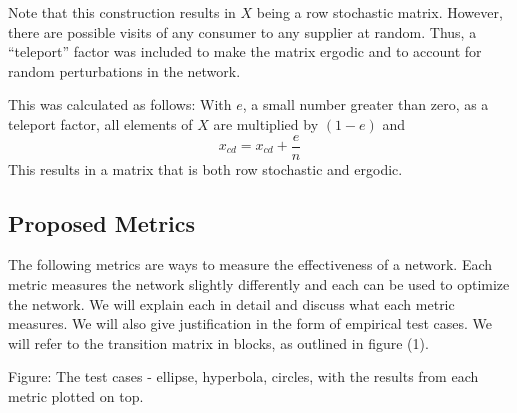 \documentclass[twoside,twocolumn]{article}
\begin{document}
Note that this construction results in $X$ being a row stochastic matrix.
However, there are possible visits of any consumer to any supplier at random.
Thus, a ``teleport'' factor was included to make the matrix ergodic and to account for random perturbations in the network.

This was calculated as follows:
With $e$, a small number greater than zero, as a teleport factor, all elements of $X$ are multiplied by $(1-e)$ and 
$$x_{cd} = x_{cd} + \frac{e}{n}$$
This results in a matrix that is both row stochastic and ergodic.








\subsection{Proposed Metrics}
The following metrics are ways to measure the effectiveness of a network.
Each metric measures the network slightly differently and each can be used to optimize the network.
We will explain each in detail and discuss what each metric measures.
We will also give justification in the form of empirical test cases.
We will refer to the transition matrix in blocks, as outlined in figure (1).


Figure: The test cases - ellipse, hyperbola, circles, with the results from each metric plotted on top.
\end{document}
